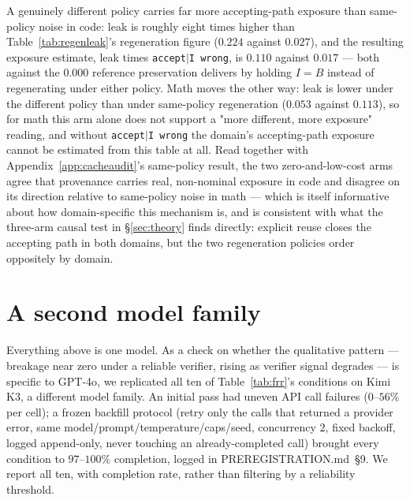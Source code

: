 \documentclass{article}
\begin{document}
A genuinely different policy carries far more accepting-path exposure than
same-policy noise in code: leak is roughly eight times higher than
Table~\ref{tab:regenleak}'s regeneration figure ($0.224$ against $0.027$), and
the resulting exposure estimate, leak times \texttt{accept$\mid$I wrong}, is
$0.110$ against $0.017$ --- both against the $0.000$ reference preservation
delivers by holding $I=B$ instead of regenerating under either policy. Math
moves the other way: leak is lower under the different policy than under
same-policy regeneration ($0.053$ against $0.113$), so for math this arm alone
does not support a "more different, more exposure" reading, and without
\texttt{accept$\mid$I wrong} the domain's accepting-path exposure cannot be
estimated from this table at all. Read together with
Appendix~\ref{app:cacheaudit}'s same-policy result, the two zero-and-low-cost
arms agree that provenance carries real, non-nominal exposure in code and
disagree on its direction relative to same-policy noise in math --- which is
itself informative about how domain-specific this mechanism is, and is
consistent with what the three-arm causal test in \S\ref{sec:theory} finds
directly: explicit reuse closes the accepting path in both domains, but the
two regeneration policies order oppositely by domain.

\section{A second model family}
\label{app:kimi}

Everything above is one model. As a check on whether the qualitative pattern
--- breakage near zero under a reliable verifier, rising as verifier signal
degrades --- is specific to GPT-4o, we replicated all ten of
Table~\ref{tab:frr}'s conditions on Kimi K3, a different model family. An
initial pass had uneven API call failures ($0$--$56\%$ per cell); a frozen
backfill protocol (retry only the calls that returned a provider error, same
model/prompt/temperature/caps/seed, concurrency $2$, fixed backoff, logged
append-only, never touching an already-completed call) brought every
condition to $97$--$100\%$ completion, logged in
PREREGISTRATION.md~\S9. We report all ten, with completion rate, rather than
filtering by a reliability threshold.
\end{document}
